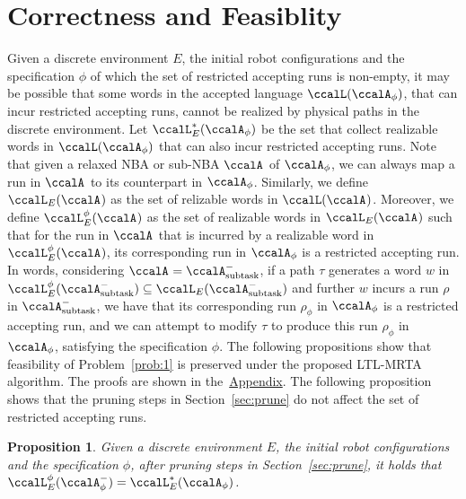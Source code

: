 \documentclass[Afour,sageh,times]{sagej}
\makeatletter
\newtheorem{prop}[thm]{Proposition}
\newcommand{\auto}[1]{\ccalA_{\textup{#1}}}
\newcommand{\autop}{\ccalA_{\phi}}
\newcommand{\vertex}[1]{v_{\textup{#1}}}
\newcommand{\scriptveryshortarrow}[1][3pt]{{%
    \hbox{\rule[\scriptratio\dimexpr\fontdimen22\textfont2-.2pt\relax]
               {\scriptratio\dimexpr#1\relax}{\scriptratio\dimexpr.4pt\relax}}%
   \mkern-4mu\hbox{\let\f@size\sf@size\usefont{U}{lasy}{m}{n}\symbol{41}}}}
\makeatother
\begin{document}
{  \section{Correctness and Feasiblity}\label{sec:correctness}
  Given a discrete environment $E$, the initial robot configurations and the specification $\phi$ of which the set of restricted accepting runs is non-empty, it may be possible that some  words in the accepted language $\ccalL(\autop)$, that can incur restricted accepting runs, cannot be realized by physical paths in the discrete environment. Let $\ccalL_E^*(\autop)$ be the set that collect realizable words in $\ccalL(\autop)$ that can also incur restricted accepting runs. %
  Note that given a relaxed NBA or sub-NBA $\auto{}$ of $\autop$, we can always map a run  in $\auto{}$ to its counterpart in $\autop$. Similarly, we define $\ccalL_E(\auto{})$ as the set of relizable words in  $\ccalL(\auto{})$. Moreover,  we define $\ccalL^\phi_E(\auto{})$ as the set of realizable words in $\ccalL_E(\auto{})$ such that for the run in $\auto{}$ that is incurred by a realizable word in $\ccalL^\phi_E(\auto{})$, its corresponding run in $\autop$ is a restricted accepting run. In words, considering $\auto{} = \auto{subtask}^-$, if a path $\tau$ generates a word $w$ in $\ccalL_E^\phi(\auto{subtask}^-) \subseteq \ccalL_E(\auto{subtask}^-)$ and further $w$ incurs a run $\rho$ in $\auto{subtask}^-$, we have that its corresponding run $\rho_\phi$ in $\autop$ is a restricted accepting run, and we can attempt to modify $\tau$  to produce this run $\rho_\phi$ in $\autop$, satisfying the specification $\phi$.
  The following propositions show that feasibility of Problem~\ref{prob:1} is preserved under the proposed LTL-MRTA algorithm. The proofs are shown in the~\hyperref[sec:appendix]{Appendix}. The following proposition shows that the pruning steps in Section~\ref{sec:prune} do not affect the set of restricted accepting runs.
  \begin{prop}\label{prop:prune}
    Given a discrete environment $E$, the initial robot configurations and the specification $\phi$, after pruning steps in Section~\ref{sec:prune}, it holds that  $\ccalL_E^\phi(\autop^-) = \ccalL^*_E(\autop)$.
  \end{prop}
}
\end{document}
